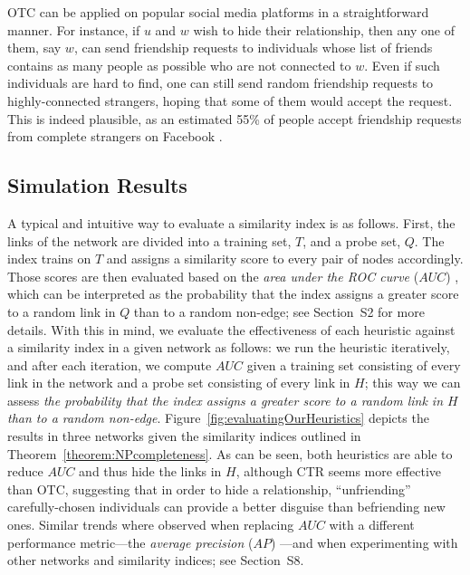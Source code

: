 \documentclass[twocolumn]{article}
\newcommand{\ROC}{\mathit{AUC}}
\newcommand{\AP}{\mathit{AP}}
\newcommand{\Hide}{H}
\begin{document}
OTC can be applied on popular social media platforms in a straightforward manner. For instance, if $u$ and $w$ wish to hide their relationship, then any one of them, say $w$, can send friendship requests to individuals whose list of friends contains as many people as possible who are not connected to $w$. Even if such individuals are hard to find, one can still send random friendship requests to highly-connected strangers, hoping that some of them would accept the request. This is indeed plausible, as an estimated 55\% of people accept friendship requests from complete strangers on Facebook \cite{Nagle:Singh:2009}. 


\subsection*{Simulation Results}

A typical and intuitive way to evaluate a similarity index is as follows. First, the links of the network are divided into a training set, $T$, and a probe set, $Q$. The index trains on $T$ and assigns a similarity score to every pair of nodes accordingly. Those scores are then evaluated based on the \emph{area under the ROC curve} ($\ROC$) \cite{fawcett2006introduction}, which can be interpreted as the probability that the index assigns a greater score to a random link in $Q$ than to a random non-edge; see Section~S2 for more details. With this in mind, we evaluate the effectiveness of each heuristic against a similarity index in a given network as follows: we run the heuristic iteratively, and after each iteration, we compute $\ROC$ given a training set consisting of every link in the network and a probe set consisting of every link in $H$; this way we can assess \textit{the probability that the index assigns a greater score to a random link in $H$ than to a random non-edge}.
Figure~\ref{fig:evaluatingOurHeuristics} depicts the results in three networks given the similarity indices outlined in Theorem~\ref{theorem:NPcompleteness}. As can be seen, both heuristics are able to reduce $\ROC$ and thus hide the links in $\Hide$, although CTR seems more effective than OTC, suggesting that in order to hide a relationship, ``unfriending'' carefully-chosen individuals can provide a better disguise than befriending new ones. Similar trends where observed when replacing $\ROC$ with a different performance metric---the \emph{average precision} ($\AP$) \cite{boyd2013area}---and when experimenting with other networks and similarity indices; see Section~S8.
\end{document}
